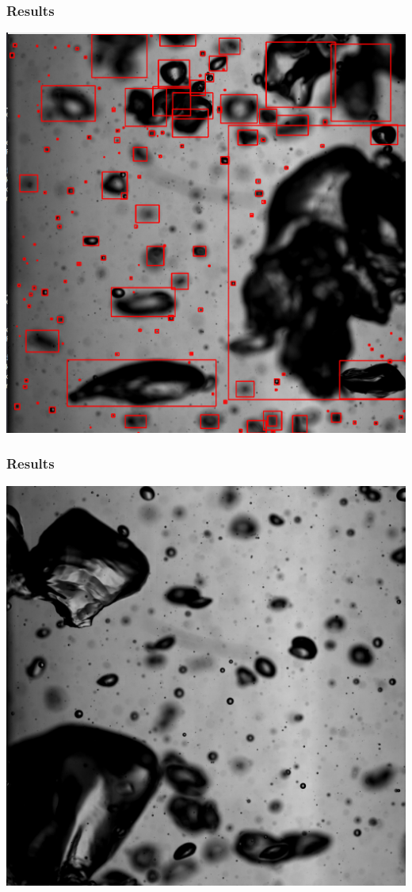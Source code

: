 \documentclass{beamer}
\begin{document}
\begin{frame}
    \frametitle{Results}
    \begin{center}
        \includegraphics[width=0.8\columnwidth]{bubble-detection}
    \end{center}
\end{frame}

\begin{frame}
    \frametitle{Results}
    \begin{center}
        \includegraphics[width=0.8\columnwidth]{orig-img-2}
    \end{center}
\end{frame}
\end{document}
